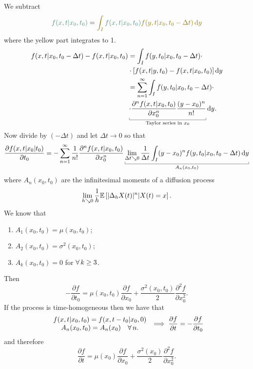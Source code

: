 \documentclass[12pt]{report}
\begin{document}
\begin{fancyproof}
	We subtract
	\begin{equation*}
		\mathcolor{Aquamarine4}{f(x,t|x_{0},t_{0})}=\mathcolor{Gold4}{\int_{I}}\mathcolor{Aquamarine4}{f(x,t|x_{0},t_{0})}\mathcolor{Gold4}{f(y,t|x_{0},t_{0}-\Delta t)\dy}
	\end{equation*}
	where the \textcolor{Gold4}{yellow} part integrates to 1. 
	\begin{align*}
		f(x,t|x_{0},t_{0}-\Delta t)-f(x,t|x_{0},t_{0})&=\int_{I}f(y,t_{0}|x_{0},t_{0}-\Delta t)\cdot\\
		&\cdot[f(x,t|y,t_{0})-f(x,t|x_{0},t_{0})]\dy\\
		&=\sum_{n=1}^{\infty}\int_{I}f(y,t_{0}|x_{0},t_{0}-\Delta t)\cdot\\
		&\ubracketthin{\cdot\frac{\partial^{n}f(x,t|x_{0},t_{0})}{\partial x_{0}^{n}}\frac{(y-x_{0})^{n}}{n!}}_{\claptext{Taylor series in $x_{0}$}}\dy.
	\end{align*}
	Now divide by $(-\Delta t)$ and let $\Delta t\to0$ so that
	\begin{equation*}
		\frac{\partial f(x,t|x_{0}|t_{0})}{\partial t_{0}}=-\sum^{\infty}_{n=1}\frac{1}{n!}\frac{\partial^{n}f(x,t|x_{0},t_{0})}{\partial x^{n}_{0}}\ubracketthin{\lim_{\Delta t\searrow0}\frac{1}{\Delta t}\int_{I}(y-x_{0})^{n}f(y,t_{0}|x_{0},t_{0}-\Delta t)\dy}_{A_{n}(x_{0},t_{0})}
	\end{equation*}
	where $A_{n}(x_{0},t_{0})$ are the infinitesimal moments of a diffusion process
	\begin{equation*}
		\lim_{h\searrow0}\frac{1}{h}\mathbb{E}\left[|\Delta_{h}X(t)|^{n}|X(t)=x\right].
	\end{equation*}
	We know that
	\begin{enumerate}
		\item $A_{1}(x_{0},t_{0})=\mu(x_{0},t_{0})$;
		\item $A_{2}(x_{0},t_{0})=\sigma^{2}(x_{0},t_{0})$;
		\item $A_{k}(x_{0},t_{0})=0$ for $\forall\, k\geq3$.
	\end{enumerate}
	Then
	\begin{equation*}
		-\frac{\partial f}{\partial t_{0}}=\mu(x_{0},t_{0})\frac{\partial f}{\partial x_{0}}+\frac{\sigma^{2}(x_{0},t_{0})}{2}\frac{\partial^{2}f}{\partial x_{0}^{2}}.
	\end{equation*}
	If the process is time-homogeneous then we have that
	\begin{equation*}
		\begin{array}{c}
			f(x,t|x_{0},t_{0})=f(x,t-t_{0}|x_{0},0)\\
			A_{n}(x_{0},t_{0})=A_{n}(x_{0})\quad\forall\, n.
		\end{array}\implies\frac{\partial f}{\partial t}=-\frac{\partial f}{\partial t_{0}}
	\end{equation*}
	and therefore
	\begin{equation*}
		\frac{\partial f}{\partial t}=\mu(x_{0})\frac{\partial f}{\partial x_{0}}+\frac{\sigma^{2}(x_{0})}{2}\frac{\partial^{2}f}{\partial x_{0}^{2}}.
	\end{equation*}
\end{fancyproof}
\end{document}
